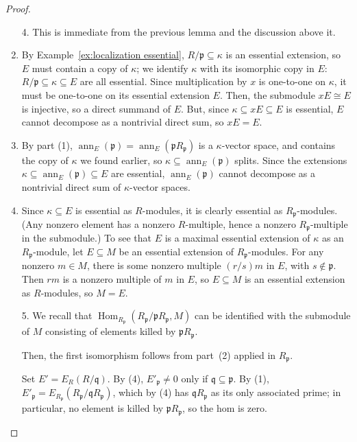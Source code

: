 \documentclass[11pt]{book}
\numberwithin{equation}{section}
\numberwithin{theorem}{chapter}
\theoremstyle{definition}
\newtheorem*{basic properties}{Basic Properties}
\newtheorem*{Important Remark}{Important Remark}
\theoremstyle{remark}
\newcommand{\p}{\mathfrak{p}}
\newcommand{\q}{\mathfrak{q}}
\newcommand{\Hom}{\operatorname{Hom}}
\newcommand{\ann}{\operatorname{ann}}
\begin{document}
\begin{proof}
	\begin{enumerate}
		
				\item[4.] This is immediate from the previous lemma and the discussion above it.
				
		\item By Example~\ref{ex:localization essential}, $R/\p \subseteq \kappa$ is an essential extension, so $E$ must contain a copy of $\kappa$; we identify $\kappa$ with its isomorphic copy in $E$: $R/\p \subseteq \kappa \subseteq E$ are all essential. Since multiplication by $x$ is one-to-one on $\kappa$, it must be one-to-one on its essential extension $E$. Then, the submodule $xE\cong E$ is injective, so a direct summand of $E$. But, since $\kappa \subseteq xE \subseteq E$ is essential, $E$ cannot decompose as a nontrivial direct sum, so $xE=E$.
		
		\item By part (1), $\ann_E(\p)=\ann_E(\p R_{\p})$ is a $\kappa$-vector space, and contains the copy of $\kappa$ we found earlier, so $\kappa \subseteq \ann_E(\p)$ splits. Since the extensions $\kappa \subseteq \ann_E(\p) \subseteq E$ are essential, $\ann_E(\p)$ cannot decompose as a nontrivial direct sum of $\kappa$-vector spaces.
		
		\item Since $\kappa \subseteq E$ is essential as $R$-modules, it is clearly essential as $R_{\p}$-modules. (Any nonzero element has a nonzero $R$-multiple, hence a nonzero $R_{\p}$-multiple in the submodule.) To see that $E$ is a maximal essential extension of $\kappa$ as an $R_{\p}$-module, let $E\subseteq M$ be an essential extension of $R_{\p}$-modules. For any nonzero $m\in M$, there is some nonzero multiple $(r/s)m$ in $E$, with $s\notin \p$. Then $rm$ is a nonzero multiple of $m$ in $E$, so $E\subseteq M$ is an essential extension as $R$-modules, so $M=E$.
		

		
		\item[5.] We recall that $\Hom_{R_\p}(R_\p/\p R_\p,M)$ can be identified with the submodule of $M$ consisting of elements killed by $\p R_\p$.
		
		Then, the first isomorphism follows from part~(2) applied in $R_\p$.
		
		Set $E'=E_R(R/\q)$. By (4), $E'_{\p}\neq0$ only if $\q \subseteq \p$. By (1), $E'_\p=E_{R_\p}(R_\p / \q R_\p)$, which by (4) has $\q R_\p$ as its only associated prime; in particular, no element is killed by $\p R_\p$, so the hom is zero.
	\end{enumerate}
\end{proof}
\end{document}
